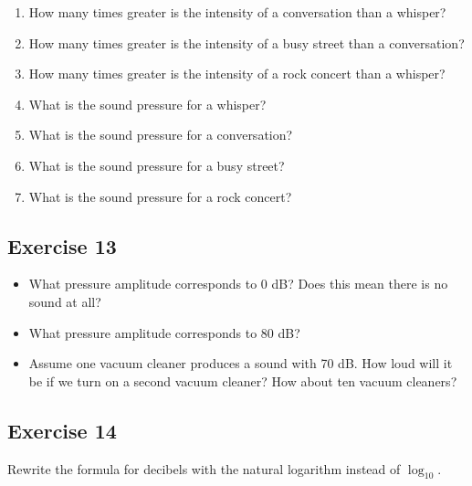 \documentclass[a4paper, 11pt]{article}
\begin{document}
\begin{enumerate}
    \item How many times greater is the intensity of a conversation than a whisper?

    \vspace{1cm}

    \item How many times greater is the intensity of a busy street than a conversation?

    \vspace{1cm}

    \item How many times greater is the intensity of a rock concert than a whisper?

    \vspace{1cm}

    \item What is the sound pressure for a whisper?
    \vspace{1cm}
    \item What is the sound pressure for a conversation?
    \vspace{1cm}
    \item What is the sound pressure for a busy street?
    \vspace{1cm}
    \item What is the sound pressure for a rock concert?
    \vspace{1.5cm}
\end{enumerate}

\subsection*{Exercise 13}
\begin{itemize}
    \item What pressure amplitude corresponds to 0 dB? Does this mean there is no sound at all?
    \vspace{1cm}
    \item What pressure amplitude corresponds to 80 dB?
    \vspace{1cm}
    \item Assume one vacuum cleaner produces a sound with 70 dB. How loud will it be if we turn on a second vacuum cleaner? How about ten vacuum cleaners?
    \vspace{1cm}
\end{itemize}

\subsection*{Exercise 14}
Rewrite the formula for decibels with the natural logarithm instead of $\log_{10}$.
\end{document}
